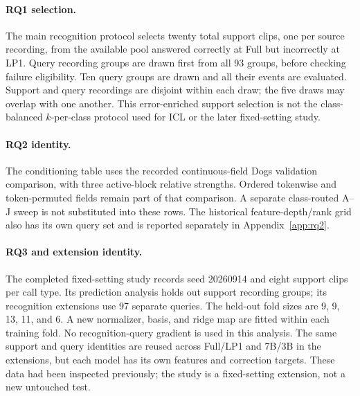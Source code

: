 \documentclass{article}
\begin{document}
\paragraph{RQ1 selection.}
The main recognition protocol selects twenty total support clips, one per source recording, from the available pool answered correctly at Full but incorrectly at LP1. Query recording groups are drawn first from all 93 groups, before checking failure eligibility. Ten query groups are drawn and all their events are evaluated. Support and query recordings are disjoint within each draw; the five draws may overlap with one another. This error-enriched support selection is not the class-balanced $k$-per-class protocol used for ICL or the later fixed-setting study.

\paragraph{RQ2 identity.}
The conditioning table uses the recorded continuous-field Dogs validation comparison, with three active-block relative strengths. Ordered tokenwise and token-permuted fields remain part of that comparison. A separate class-routed A--J sweep is not substituted into these rows. The historical feature-depth/rank grid also has its own query set and is reported separately in Appendix~\ref{app:rq2}.

\paragraph{RQ3 and extension identity.}
The completed fixed-setting study records seed 20260914 and eight support clips per call type. Its prediction analysis holds out support recording groups; its recognition extensions use 97 separate queries. The held-out fold sizes are 9, 9, 13, 11, and 6. A new normalizer, basis, and ridge map are fitted within each training fold. No recognition-query gradient is used in this analysis. The same support and query identities are reused across Full/LP1 and 7B/3B in the extensions, but each model has its own features and correction targets. These data had been inspected previously; the study is a fixed-setting extension, not a new untouched test.
\end{document}
